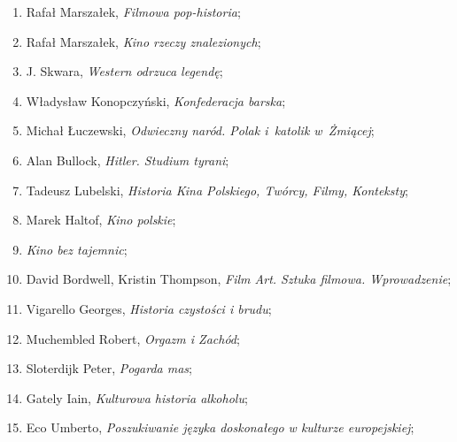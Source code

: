 \documentclass[a4paper,11pt]{article}
\begin{document}
\begin{enumerate}
\item Rafał Marszałek, \textit{Filmowa pop-historia};



\item Rafał Marszałek, \textit{Kino rzeczy znalezionych};



\item J. Skwara, \textit{Western odrzuca legendę};



\item Władysław Konopczyński, \textit{Konfederacja barska};



\item Michał Łuczewski, \textit{Odwieczny naród. Polak i~katolik
    w~Żmiącej};



\item Alan Bullock, \textit{Hitler. Studium tyrani};



\item Tadeusz Lubelski, \textit{Historia Kina Polskiego, Twórcy, Filmy,
    Konteksty};



\item Marek Haltof, \textit{Kino polskie};



\item \textit{Kino bez tajemnic};



\item David Bordwell, Kristin Thompson, \textit{Film Art. Sztuka
    filmowa. Wprowadzenie};



\item Vigarello Georges, \textit{Historia czystości i brudu};



\item Muchembled Robert, \textit{Orgazm i Zachód};



\item Sloterdijk Peter, \textit{Pogarda mas};



\item Gately Iain, \textit{Kulturowa historia alkoholu};



\item Eco Umberto, \textit{Poszukiwanie języka doskonałego w kulturze
    europejskiej};




\end{enumerate}
\end{document}
